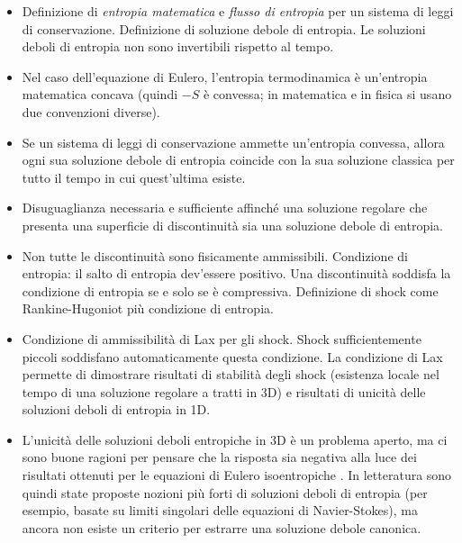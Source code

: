 \begin{itemize}
\item Definizione di \emph{entropia matematica} e \emph{flusso di entropia}
	per un sistema di leggi di conservazione.
	Definizione di soluzione debole di entropia.
	Le soluzioni deboli di entropia non sono invertibili rispetto al tempo.
\item Nel caso dell'equazione di Eulero, l'entropia termodinamica
	è un'entropia matematica concava (quindi $-S$ è convessa; in
	matematica e in fisica si usano due convenzioni diverse).
\item Se un sistema di leggi di conservazione ammette un'entropia convessa,
	allora ogni sua soluzione debole	di entropia coincide con la sua
	soluzione classica per tutto il tempo in cui quest'ultima esiste.
\item Disuguaglianza necessaria e sufficiente affinché una soluzione regolare
	che presenta una superficie di discontinuità sia una soluzione debole di entropia.
\item Non tutte le discontinuità sono fisicamente ammissibili.
	Condizione di entropia: il salto di entropia dev'essere positivo.
	Una discontinuità soddisfa la condizione di entropia se e solo se è compressiva.
	Definizione di shock come Rankine-Hugoniot più condizione di entropia.
\item Condizione di ammissibilità di Lax per gli shock.
	Shock sufficientemente piccoli soddisfano automaticamente questa
	condizione. La condizione di Lax permette di dimostrare
	risultati di stabilità degli shock (esistenza locale nel tempo
	di una soluzione regolare a tratti in 3D) %
	e risultati di unicità delle soluzioni deboli di entropia in 1D.
\item L'unicità delle soluzioni deboli entropiche in 3D è un problema aperto,
	ma ci sono buone ragioni per pensare che
	la risposta sia negativa alla luce dei risultati ottenuti
	per le equazioni di Eulero isoentropiche \cite{chiodaroli}.
	In letteratura sono quindi state proposte nozioni più forti
	di soluzioni deboli di entropia (per esempio, basate su
	limiti singolari delle equazioni di Navier-Stokes),
	ma ancora non esiste un criterio per estrarre una soluzione debole canonica.
\end{itemize}

